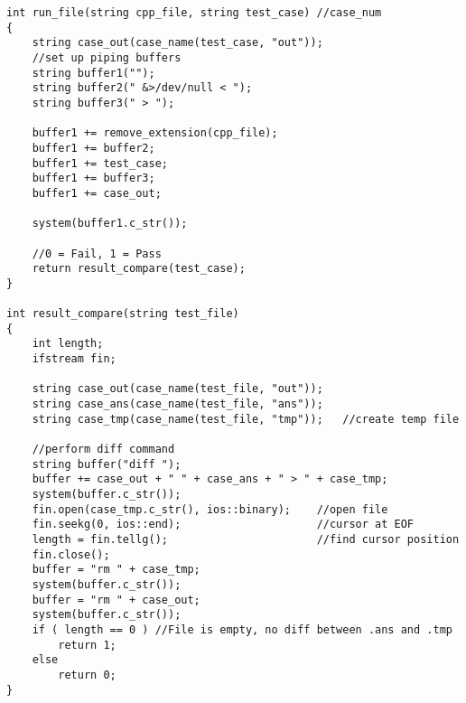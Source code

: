 \begin{lstlisting}
int run_file(string cpp_file, string test_case) //case_num
{
    string case_out(case_name(test_case, "out"));
    //set up piping buffers
    string buffer1("");
    string buffer2(" &>/dev/null < ");
    string buffer3(" > ");

    buffer1 += remove_extension(cpp_file);
    buffer1 += buffer2;
    buffer1 += test_case;
    buffer1 += buffer3;
    buffer1 += case_out;

    system(buffer1.c_str());

    //0 = Fail, 1 = Pass
    return result_compare(test_case);
}

int result_compare(string test_file)
{
    int length;
    ifstream fin;

    string case_out(case_name(test_file, "out"));
    string case_ans(case_name(test_file, "ans"));
    string case_tmp(case_name(test_file, "tmp"));   //create temp file
    
    //perform diff command
    string buffer("diff ");
    buffer += case_out + " " + case_ans + " > " + case_tmp;
    system(buffer.c_str());    
    fin.open(case_tmp.c_str(), ios::binary);    //open file
    fin.seekg(0, ios::end);                     //cursor at EOF
    length = fin.tellg();                       //find cursor position
    fin.close();
    buffer = "rm " + case_tmp;
    system(buffer.c_str());
    buffer = "rm " + case_out;
    system(buffer.c_str());
    if ( length == 0 ) //File is empty, no diff between .ans and .tmp
        return 1;
    else
        return 0;
}
\end{lstlisting}


